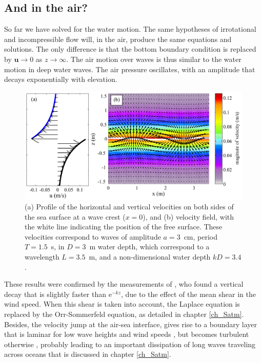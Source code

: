 \subsection{And in the air?}
So far we have solved for the water motion. The same hypotheses of irrotational 
and incompressible flow will, in the air, produce the same equations and solutions. 
The only difference is that the bottom boundary condition is replaced by 
${\mathbf u}\rightarrow0$ as $z\rightarrow\infty$.
The air motion over waves is thus similar to the water motion in deep water waves. 
The air pressure oscillates, with an amplitude that decays exponentially 
with elevation. 
\begin{figure}
\centerline{\includegraphics[width=\textwidth]{FIGS_CH_AIRY/vitesse_air_eau_en.pdf}}
  \caption{(a) Profile of the horizontal and vertical velocities on both sides 
of the sea surface at a wave crest ($x=0$), and (b) velocity field, with the white line indicating 
the position of the free surface. These velocities correspond to waves of amplitude $a=3$~cm, 
period $T=1.5$~s, in $D=3$~m water depth, which correspond to a wavelength 
$L=3.5$~m, and a non-dimensional water depth $kD=3.4$. }
\label{vitesse_air_eau}
\end{figure}

These results were confirmed by the measurements of \cite{Elliott1972a}, who 
found a vertical decay that is slightly faster than $\mathrm{e}^{-kz}$, due to 
the effect of the mean shear in the wind speed. When this shear is taken into account, the
Laplace equation is replaced by the Orr-Sommerfeld equation, as detailed in chapter \ref{ch_Satm}.
Besides, the velocity jump at the air-sea interface, gives rise to a boundary layer 
that is laminar for low wave heights and wind speeds \citep{Dore1978}, but becomes turbulent 
otherwise \citep{Perignon&al.2014}, probably leading to an important dissipation of long waves traveling across oceans that is 
discussed in chapter \ref{ch_Satm}.

